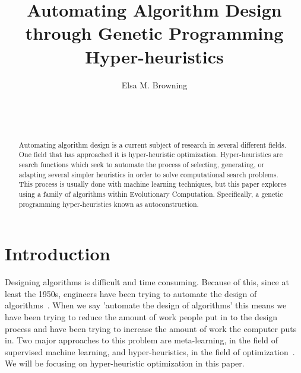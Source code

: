\documentclass{sig-alternate}
\begin{document}

\title{Automating Algorithm Design through Genetic Programming Hyper-heuristics}


\author{
\alignauthor
Elsa M. Browning\\
	\\
	\\
	\\
}

\maketitle
\begin{abstract}
	Automating algorithm design is a current subject of research in several different fields. One field that has approached it is hyper-heuristic optimization. Hyper-heuristics are search functions which seek to automate the process of selecting, generating, or adapting several simpler heuristics in order to solve computational search problems. This process is usually done with machine learning techniques, but this paper explores using a family of algorithms within Evolutionary Computation. Specifically, a genetic programming hyper-heuristics known as autoconstruction.
\end{abstract}


\section{Introduction}
\label{sec:introduction}
Designing algorithms is difficult and time consuming. Because of this, since at least the 1950s, engineers have been trying to automate the design of algorithms~\cite{pappa:2014}. When we say 'automate the design of algorithms' this means we have been trying to reduce the amount of work people put in to the design process and have been trying to increase the amount of work the computer puts in. Two major approaches to this problem are meta-learning, in the field of supervised machine learning, and hyper-heuristics, in the field of optimization~\cite{pappa:2014}. We will be focusing on hyper-heuristic optimization in this paper.
\end{document}
